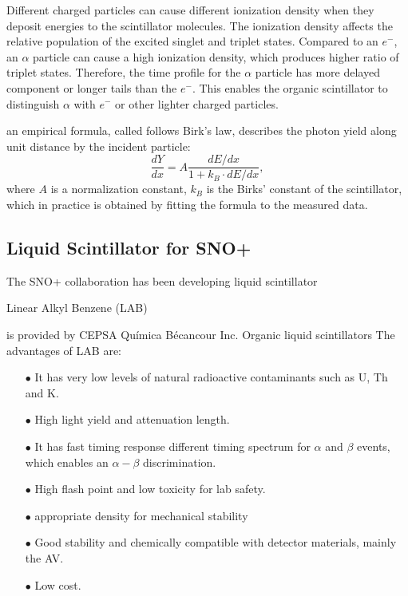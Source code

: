 Different charged particles can cause different ionization density when they deposit energies to the scintillator molecules. The ionization density affects the relative population of the excited singlet and triplet states. Compared to an $e^-$, an $\alpha$ particle can cause a high ionization density, which produces higher ratio of triplet states. Therefore, the time profile for the $\alpha$ particle has more delayed component or longer tails than the $e^-$. This enables the organic scintillator to distinguish $\alpha$ with $e^-$ or other lighter charged particles\cite{dunger2018topological, scintillatorPaper}. 





an empirical formula, called follows Birk's law\cite{birks1951scintillations, birks1965theory}, describes the photon yield along unit distance by the incident particle:
\[
\frac{dY}{dx}=A\frac{dE/dx}{1+k_B\cdot dE/dx},
\]
where $A$ is a normalization constant, $k_B$ is the Birks' constant of the scintillator, which in practice is obtained by fitting the formula to the measured data.




\subsection{Liquid Scintillator for SNO+}

The SNO+ collaboration has been developing liquid scintillator 

Linear Alkyl Benzene (LAB)

is provided by CEPSA Qu\'{i}mica B\'ecancour Inc.
Organic liquid scintillators 
The advantages of LAB are:

\begin{itemize}
	\item[$\bullet$] It has very low levels of natural radioactive contaminants such as U, Th and K.
	\item[$\bullet$] High light yield and attenuation length.
	\item[$\bullet$] It has fast timing response 
	different timing spectrum for $\alpha$ and $\beta$ events, which enables an $\alpha-\beta$ discrimination. 
	\item[$\bullet$] High flash point and low toxicity for lab safety.
	\item[$\bullet$] appropriate density for mechanical stability
	\item[$\bullet$] Good stability and chemically compatible with detector materials, mainly the AV.
	\item[$\bullet$] Low cost.
\end{itemize}


